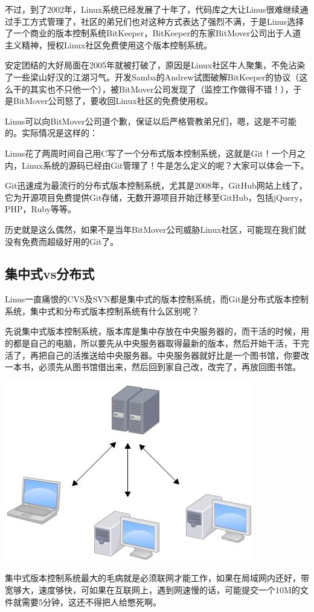 \documentclass[•]{article}
\begin{document}
\begin{CJK}{UTF8}{gbsn}
\qquad 不过，到了2002年，Linux系统已经发展了十年了，代码库之大让Linus很难继续通过手工方式管理了，社区的弟兄们也对这种方式表达了强烈不满，于是Linus选择了一个商业的版本控制系统BitKeeper，BitKeeper的东家BitMover公司出于人道主义精神，授权Linux社区免费使用这个版本控制系统。

\qquad 安定团结的大好局面在2005年就被打破了，原因是Linux社区牛人聚集，不免沾染了一些梁山好汉的江湖习气。开发Samba的Andrew试图破解BitKeeper的协议（这么干的其实也不只他一个），被BitMover公司发现了（监控工作做得不错！），于是BitMover公司怒了，要收回Linux社区的免费使用权。

\qquad Linus可以向BitMover公司道个歉，保证以后严格管教弟兄们，嗯，这是不可能的。实际情况是这样的：

\qquad Linus花了两周时间自己用C写了一个分布式版本控制系统，这就是Git！一个月之内，Linux系统的源码已经由Git管理了！牛是怎么定义的呢？大家可以体会一下。

\qquad Git迅速成为最流行的分布式版本控制系统，尤其是2008年，GitHub网站上线了，它为开源项目免费提供Git存储，无数开源项目开始迁移至GitHub，包括jQuery，PHP，Ruby等等。

\qquad 历史就是这么偶然，如果不是当年BitMover公司威胁Linux社区，可能现在我们就没有免费而超级好用的Git了。

\subsection{集中式vs分布式}

\qquad Linus一直痛恨的CVS及SVN都是集中式的版本控制系统，而Git是分布式版本控制系统，集中式和分布式版本控制系统有什么区别呢？

\qquad 先说集中式版本控制系统，版本库是集中存放在中央服务器的，而干活的时候，用的都是自己的电脑，所以要先从中央服务器取得最新的版本，然后开始干活，干完活了，再把自己的活推送给中央服务器。中央服务器就好比是一个图书馆，你要改一本书，必须先从图书馆借出来，然后回到家自己改，改完了，再放回图书馆。
\begin{center}
\includegraphics[scale=0.6]{2.jpeg}
\end{center}
\qquad 集中式版本控制系统最大的毛病就是必须联网才能工作，如果在局域网内还好，带宽够大，速度够快，可如果在互联网上，遇到网速慢的话，可能提交一个10M的文件就需要5分钟，这还不得把人给憋死啊。


\end{CJK}
\end{document}
